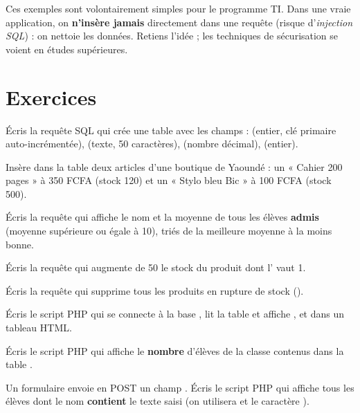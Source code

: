 \begin{attention}
Ces exemples sont volontairement simples pour le programme TI. Dans une vraie
application, on \textbf{n'insère jamais} directement  dans une
requête (risque d'\emph{injection SQL}) : on nettoie les données. Retiens
l'idée ; les techniques de sécurisation se voient en études supérieures.
\end{attention}

\section{Exercices}


Écris la requête SQL qui crée une table  avec les champs :
 (entier, clé primaire auto-incrémentée), 
(texte, 50 caractères),  (nombre décimal),  (entier).

Insère dans la table  deux articles d'une boutique de Yaoundé :
un « Cahier 200 pages » à 350 FCFA (stock 120) et un « Stylo bleu Bic »
à 100 FCFA (stock 500).

Écris la requête qui affiche le nom et la moyenne de tous les élèves
\textbf{admis} (moyenne supérieure ou égale à 10), triés de la meilleure
moyenne à la moins bonne.

Écris la requête qui augmente de 50 le stock du produit dont l' vaut 1.

Écris la requête qui supprime tous les produits en rupture de stock
().

Écris le script PHP qui se connecte à la base , lit la table
 et affiche ,  et 
dans un tableau HTML.

Écris le script PHP qui affiche le \textbf{nombre} d'élèves de la classe
 contenus dans la table .


Un formulaire envoie en POST un champ . Écris le script PHP qui
affiche tous les élèves dont le nom \textbf{contient} le texte saisi (on
utilisera  et le caractère \code{\%}).

